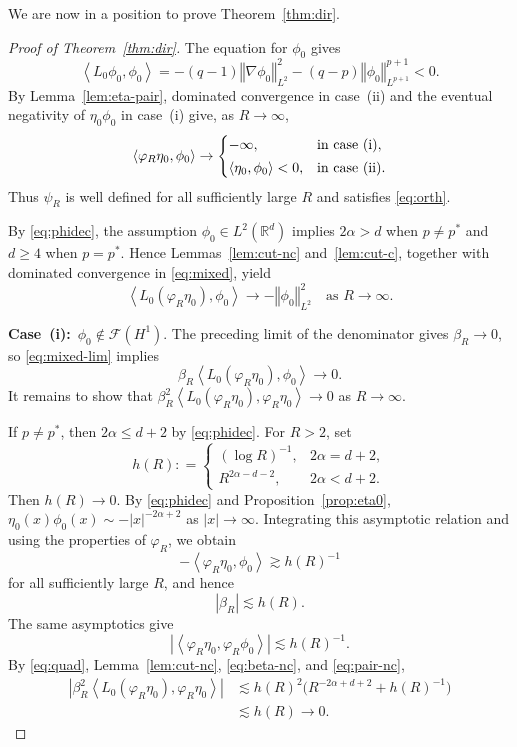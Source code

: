 \documentclass[12pt, a4paper, reqno]{amsart}
\numberwithin{equation}{section}
\theoremstyle{definition}
\theoremstyle{remark}
\newcommand{\R}{\mathbb R}
\newcommand{\cF}{\mathcal F}
\def\tbra[#1,#2]{{\left\langle #1,#2\right\rangle}}
\def\norm[#1]{{\left\Vert #1 \right\Vert}}
\def\abs[#1]{{\left\vert #1 \right\vert}}
\newcommand{\ce}{\mathrel{\mathop:}=}
\begin{document}
We are now in a position to prove Theorem~\ref{thm:dir}.

\begin{proof}[Proof of Theorem~\ref{thm:dir}]
The equation for $\phi_0$ gives
\[
  \tbra[L_0\phi_0,\phi_0]
  =-(q-1)\norm[\nabla\phi_0]_{L^2}^2
   -(q-p)\norm[\phi_0]_{L^{p+1}}^{p+1}<0.
\]
By Lemma~\ref{lem:eta-pair}, dominated convergence in case~\textup{(ii)}
and the eventual negativity of $\eta_0\phi_0$ in case~\textup{(i)} give,
as $R\to\infty$,
\[
  \tbra[\varphi_R\eta_0,\phi_0]
  \to
  \begin{cases}
    -\infty, & \text{in case~\textup{(i)}},\\[2pt]
    \tbra[\eta_0,\phi_0]<0, & \text{in case~\textup{(ii)}}.
  \end{cases}
\]
Thus $\psi_R$ is well defined for all sufficiently
large $R$ and satisfies \eqref{eq:orth}.

By \eqref{eq:phidec}, the assumption $\phi_0\in L^2(\R^d)$ implies
$2\alpha>d$ when $p\ne p^*$ and $d\ge4$ when $p=p^*$.
Hence Lemmas~\ref{lem:cut-nc} and~\ref{lem:cut-c}, together with
dominated convergence in \eqref{eq:mixed}, yield
\begin{equation}\label{eq:mixed-lim}
  \tbra[L_0(\varphi_R\eta_0),\phi_0]
  \to-\norm[\phi_0]_{L^2}^2
  \quad\text{as }R\to\infty.
\end{equation}

\medskip
\noindent\textbf{Case~\textup{(i)}:}~$\phi_0\notin\cF(H^1)$.
The preceding limit of the denominator gives $\beta_R\to0$, so
\eqref{eq:mixed-lim} implies
\[
  \beta_R\tbra[L_0(\varphi_R\eta_0),\phi_0]\to0.
\]
It remains to show that
$\beta_R^2\tbra[L_0(\varphi_R\eta_0),\varphi_R\eta_0]\to0$ as $R\to\infty$.

If $p\ne p^*$, then $2\alpha\le d+2$ by
\eqref{eq:phidec}. For $R>2$, set
\[
  h(R)
  \ce \begin{cases}
    (\log R)^{-1}, & 2\alpha=d+2,\\
    R^{2\alpha-d-2}, & 2\alpha<d+2.
  \end{cases}
\]
Then $h(R)\to0$. By \eqref{eq:phidec} and
Proposition~\ref{prop:eta0},
$\eta_0(x)\phi_0(x)\sim-|x|^{-2\alpha+2}$ as $|x|\to\infty$.
Integrating this asymptotic relation and using the properties of
$\varphi_R$, we obtain
\[
  -\tbra[\varphi_R\eta_0,\phi_0]\gtrsim h(R)^{-1}
\]
for all sufficiently large $R$, and hence
\begin{equation}\label{eq:beta-nc}
  |\beta_R|\lesssim h(R).
\end{equation}
The same asymptotics give
\begin{equation}\label{eq:pair-nc}
  \abs[{\tbra[\varphi_R\eta_0,\varphi_R\phi_0]}]
  \lesssim h(R)^{-1}.
\end{equation}
By \eqref{eq:quad}, Lemma~\ref{lem:cut-nc},
\eqref{eq:beta-nc}, and \eqref{eq:pair-nc},
\begin{align*}
  \abs[{\beta_R^2
    \tbra[L_0(\varphi_R\eta_0),\varphi_R\eta_0]}]
  &\lesssim h(R)^2
    \bigl(R^{-2\alpha+d+2}+h(R)^{-1}\bigr)
  \\
  &\lesssim h(R)\to0.
\end{align*}


\end{proof}
\end{document}

